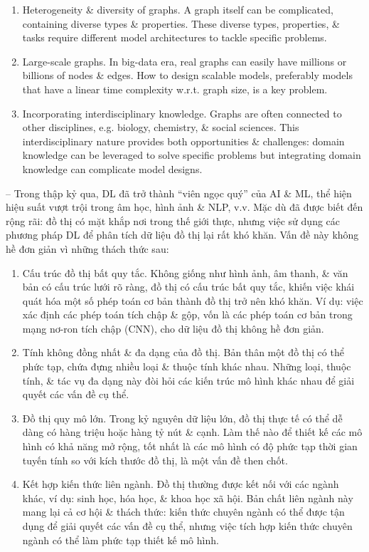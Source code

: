 \documentclass{article}
\begin{document}
\begin{itemize}
\begin{itemize}
\begin{enumerate}
            \item Heterogeneity \& diversity of graphs. A graph itself can be complicated, containing diverse types \& properties. These diverse types, properties, \& tasks require different model architectures to tackle specific problems.
            \item Large-scale graphs. In big-data era, real graphs can easily have millions or billions of nodes \& edges. How to design scalable models, preferably models that have a linear time complexity w.r.t. graph size, is a key problem.
            \item Incorporating interdisciplinary knowledge. Graphs are often connected to other disciplines, e.g. biology, chemistry, \& social sciences. This interdisciplinary nature provides both opportunities \& challenges: domain knowledge can be leveraged to solve specific problems but integrating domain knowledge can complicate model designs.
        \end{enumerate}
        -- Trong thập kỷ qua, DL đã trở thành ``viên ngọc quý'' của AI \& ML, thể hiện hiệu suất vượt trội trong âm học, hình ảnh \& NLP, v.v. Mặc dù đã được biết đến rộng rãi: đồ thị có mặt khắp nơi trong thế giới thực, nhưng việc sử dụng các phương pháp DL để phân tích dữ liệu đồ thị lại rất khó khăn. Vấn đề này không hề đơn giản vì những thách thức sau:
        \begin{enumerate}
            \item Cấu trúc đồ thị bất quy tắc. Không giống như hình ảnh, âm thanh, \& văn bản có cấu trúc lưới rõ ràng, đồ thị có cấu trúc bất quy tắc, khiến việc khái quát hóa một số phép toán cơ bản thành đồ thị trở nên khó khăn. Ví dụ: việc xác định các phép toán tích chập \& gộp, vốn là các phép toán cơ bản trong mạng nơ-ron tích chập (CNN), cho dữ liệu đồ thị không hề đơn giản.
            \item Tính không đồng nhất \& đa dạng của đồ thị. Bản thân một đồ thị có thể phức tạp, chứa đựng nhiều loại \& thuộc tính khác nhau. Những loại, thuộc tính, \& tác vụ đa dạng này đòi hỏi các kiến trúc mô hình khác nhau để giải quyết các vấn đề cụ thể.
            \item Đồ thị quy mô lớn. Trong kỷ nguyên dữ liệu lớn, đồ thị thực tế có thể dễ dàng có hàng triệu hoặc hàng tỷ nút \& cạnh. Làm thế nào để thiết kế các mô hình có khả năng mở rộng, tốt nhất là các mô hình có độ phức tạp thời gian tuyến tính so với kích thước đồ thị, là một vấn đề then chốt.
            \item Kết hợp kiến thức liên ngành. Đồ thị thường được kết nối với các ngành khác, ví dụ: sinh học, hóa học, \& khoa học xã hội. Bản chất liên ngành này mang lại cả cơ hội \& thách thức: kiến thức chuyên ngành có thể được tận dụng để giải quyết các vấn đề cụ thể, nhưng việc tích hợp kiến thức chuyên ngành có thể làm phức tạp thiết kế mô hình.

\end{enumerate}
\end{itemize}
\end{itemize}
\end{document}
